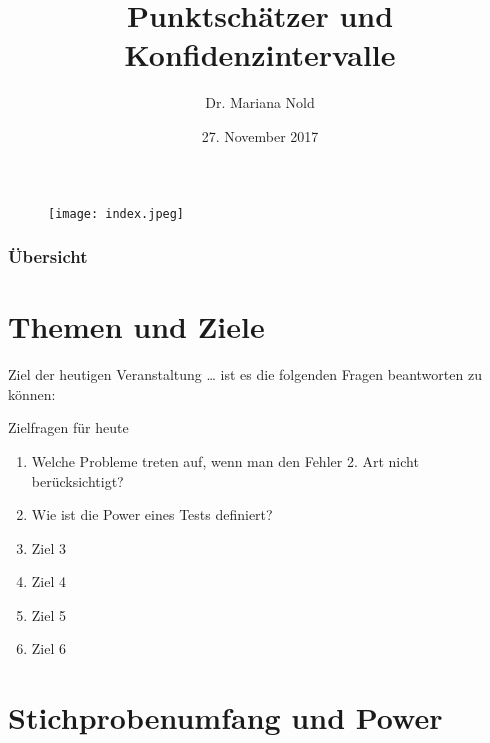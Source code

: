 \documentclass[usenames,dvipsnames,handout]{beamer}
\begin{document}
\author[Dr. Mariana Nold]{Dr. Mariana Nold}
 \date{}
\title [Punktschätzer und Konfidenzintervalle ]{Punktschätzer und Konfidenzintervalle }
\date{27. November 2017}
\begin{frame}
\maketitle

  \begin{figure}[ht]
 	\centering
 	      \texttt{[image: index.jpeg]}
 	\end{figure}
\end{frame} 

\begin{frame}
  \frametitle{Übersicht}
  \tableofcontents
\end{frame}

\section{Themen und Ziele}





\begin{frame}{Ziel der heutigen Veranstaltung \dots}
ist es die folgenden Fragen beantworten zu können:
\begin{block}{Zielfragen für heute}
\begin{enumerate}
\item{Welche Probleme treten auf, wenn man den Fehler 2. Art nicht berücksichtigt?}
\item{Wie ist die Power eines Tests definiert?}
\item{Ziel 3}
\item{Ziel 4}
\item{Ziel 5}
\item{Ziel 6}
\end{enumerate}
\end{block}
\end{frame}
\section{Stichprobenumfang und Power}
\end{document}
